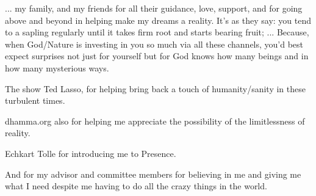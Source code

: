 ... my family, and my friends for all their guidance, love, support, and for going above and beyond in helping make my dreams a reality. It's as they say: you tend to a sapling regularly until it takes firm root and starts bearing fruit; ... Because, when God/Nature is investing in you so much via all these channels, you'd best expect surprises not just for yourself but for God knows how many beings and in how many mysterious ways.

The show Ted Lasso, for helping bring back a touch of humanity/sanity in these turbulent times.

dhamma.org also for helping me appreciate the possibility of the limitlessness of reality.

Echkart Tolle for introducing me to Presence.

And for my advisor and committee members for believing in me and giving me what I need despite me having to do all the crazy things in the world.